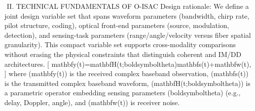 {}﻿\markdownRendererHash{} II. TECHNICAL FUNDAMENTALS OF O-ISAC\markdownRendererInterblockSeparator
{}\markdownRendererSectionBegin
{}\markdownRendererInterblockSeparator
{}\markdownRendererSectionBegin
{}\markdownRendererInterblockSeparator
{}Design rationale: We define a joint design variable set that spans waveform parameters (bandwidth, chirp rate, pilot structure, coding), optical front-end parameters (source, modulation, detection), and sensing-task parameters (range/angle/velocity versus fiber spatial granularity). This compact variable set supports cross-modality comparisons without erasing the physical constraints that distinguish coherent and IM/DD architectures.\markdownRendererParagraphSeparator
{}\markdownRendererSoftLineBreak
{}[\markdownRendererSoftLineBreak
{}\markdownRendererBackslash{}mathbf\markdownRendererLeftBrace{}y\markdownRendererRightBrace{}(t)=\markdownRendererBackslash{}mathbf\markdownRendererLeftBrace{}H\markdownRendererRightBrace{}(t;\markdownRendererBackslash{}boldsymbol\markdownRendererLeftBrace{}\markdownRendererBackslash{}theta\markdownRendererRightBrace{})\markdownRendererBackslash{}mathbf\markdownRendererLeftBrace{}s\markdownRendererRightBrace{}(t)+\markdownRendererBackslash{}mathbf\markdownRendererLeftBrace{}w\markdownRendererRightBrace{}(t),\markdownRendererSoftLineBreak
{}]\markdownRendererSoftLineBreak
{}where (\markdownRendererBackslash{}mathbf\markdownRendererLeftBrace{}y\markdownRendererRightBrace{}(t)) is the received complex baseband observation, (\markdownRendererBackslash{}mathbf\markdownRendererLeftBrace{}s\markdownRendererRightBrace{}(t)) is the transmitted complex baseband waveform, (\markdownRendererBackslash{}mathbf\markdownRendererLeftBrace{}H\markdownRendererRightBrace{}(t;\markdownRendererBackslash{}boldsymbol\markdownRendererLeftBrace{}\markdownRendererBackslash{}theta\markdownRendererRightBrace{})) is a parametric operator embedding sensing parameters (\markdownRendererBackslash{}boldsymbol\markdownRendererLeftBrace{}\markdownRendererBackslash{}theta\markdownRendererRightBrace{}) (e.g., delay, Doppler, angle), and (\markdownRendererBackslash{}mathbf\markdownRendererLeftBrace{}w\markdownRendererRightBrace{}(t)) is receiver noise.\markdownRendererParagraphSeparator
{}\markdownRendererSoftLineBreak
